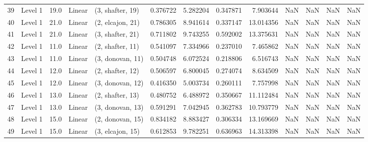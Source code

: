 \begin{tabular}{llrllrrrrrrrr}
39 &   Level 1 &   19.0 &      Linear &  (3, shafter, 19) &   0.376722 &   5.282204 &  0.347871 &   7.903644 &                  NaN &                    NaN &                 NaN &                   NaN \\
40 &   Level 1 &   21.0 &      Linear &  (2, elcajon, 21) &   0.786305 &   8.941614 &  0.337147 &  13.014356 &                  NaN &                    NaN &                 NaN &                   NaN \\
41 &   Level 1 &   21.0 &      Linear &  (3, shafter, 21) &   0.711802 &   9.743255 &  0.592002 &  13.375631 &                  NaN &                    NaN &                 NaN &                   NaN \\
42 &   Level 1 &   11.0 &      Linear &  (2, shafter, 11) &   0.541097 &   7.334966 &  0.237010 &   7.465862 &                  NaN &                    NaN &                 NaN &                   NaN \\
43 &   Level 1 &   11.0 &      Linear &  (3, donovan, 11) &   0.504748 &   6.072524 &  0.218806 &   6.516743 &                  NaN &                    NaN &                 NaN &                   NaN \\
44 &   Level 1 &   12.0 &      Linear &  (2, shafter, 12) &   0.506597 &   6.800045 &  0.274074 &   8.634509 &                  NaN &                    NaN &                 NaN &                   NaN \\
45 &   Level 1 &   12.0 &      Linear &  (3, donovan, 12) &   0.416350 &   5.003734 &  0.260111 &   7.757998 &                  NaN &                    NaN &                 NaN &                   NaN \\
46 &   Level 1 &   13.0 &      Linear &  (2, shafter, 13) &   0.480752 &   6.488972 &  0.350667 &  11.112484 &                  NaN &                    NaN &                 NaN &                   NaN \\
47 &   Level 1 &   13.0 &      Linear &  (3, donovan, 13) &   0.591291 &   7.042945 &  0.362783 &  10.793779 &                  NaN &                    NaN &                 NaN &                   NaN \\
48 &   Level 1 &   15.0 &      Linear &  (2, donovan, 15) &   0.834182 &   8.883427 &  0.306334 &  13.169669 &                  NaN &                    NaN &                 NaN &                   NaN \\
49 &   Level 1 &   15.0 &      Linear &  (3, elcajon, 15) &   0.612853 &   9.782251 &  0.636963 &  14.313398 &                  NaN &                    NaN &                 NaN &                   NaN \\

\end{tabular}
